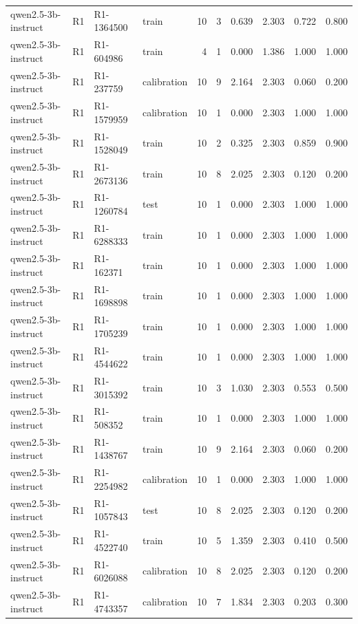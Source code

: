 \begin{table}
\begin{tabular}{llllrrrrrr}
qwen2.5-3b-instruct & R1 & R1-1364500 & train & 10 & 3 & 0.639 & 2.303 & 0.722 & 0.800 \\
qwen2.5-3b-instruct & R1 & R1-604986 & train & 4 & 1 & 0.000 & 1.386 & 1.000 & 1.000 \\
qwen2.5-3b-instruct & R1 & R1-237759 & calibration & 10 & 9 & 2.164 & 2.303 & 0.060 & 0.200 \\
qwen2.5-3b-instruct & R1 & R1-1579959 & calibration & 10 & 1 & 0.000 & 2.303 & 1.000 & 1.000 \\
qwen2.5-3b-instruct & R1 & R1-1528049 & train & 10 & 2 & 0.325 & 2.303 & 0.859 & 0.900 \\
qwen2.5-3b-instruct & R1 & R1-2673136 & train & 10 & 8 & 2.025 & 2.303 & 0.120 & 0.200 \\
qwen2.5-3b-instruct & R1 & R1-1260784 & test & 10 & 1 & 0.000 & 2.303 & 1.000 & 1.000 \\
qwen2.5-3b-instruct & R1 & R1-6288333 & train & 10 & 1 & 0.000 & 2.303 & 1.000 & 1.000 \\
qwen2.5-3b-instruct & R1 & R1-162371 & train & 10 & 1 & 0.000 & 2.303 & 1.000 & 1.000 \\
qwen2.5-3b-instruct & R1 & R1-1698898 & train & 10 & 1 & 0.000 & 2.303 & 1.000 & 1.000 \\
qwen2.5-3b-instruct & R1 & R1-1705239 & train & 10 & 1 & 0.000 & 2.303 & 1.000 & 1.000 \\
qwen2.5-3b-instruct & R1 & R1-4544622 & train & 10 & 1 & 0.000 & 2.303 & 1.000 & 1.000 \\
qwen2.5-3b-instruct & R1 & R1-3015392 & train & 10 & 3 & 1.030 & 2.303 & 0.553 & 0.500 \\
qwen2.5-3b-instruct & R1 & R1-508352 & train & 10 & 1 & 0.000 & 2.303 & 1.000 & 1.000 \\
qwen2.5-3b-instruct & R1 & R1-1438767 & train & 10 & 9 & 2.164 & 2.303 & 0.060 & 0.200 \\
qwen2.5-3b-instruct & R1 & R1-2254982 & calibration & 10 & 1 & 0.000 & 2.303 & 1.000 & 1.000 \\
qwen2.5-3b-instruct & R1 & R1-1057843 & test & 10 & 8 & 2.025 & 2.303 & 0.120 & 0.200 \\
qwen2.5-3b-instruct & R1 & R1-4522740 & train & 10 & 5 & 1.359 & 2.303 & 0.410 & 0.500 \\
qwen2.5-3b-instruct & R1 & R1-6026088 & calibration & 10 & 8 & 2.025 & 2.303 & 0.120 & 0.200 \\
qwen2.5-3b-instruct & R1 & R1-4743357 & calibration & 10 & 7 & 1.834 & 2.303 & 0.203 & 0.300 \\

\end{tabular}
\end{table}
